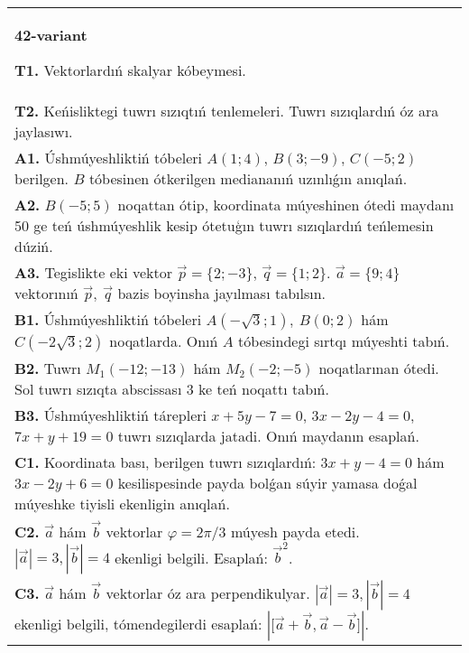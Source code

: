 \documentclass{article}
\begin{document}
\begin{tabular}{m{17cm}}
\textbf{42-variant}

\textbf{T1.} 
Vektorlardıń skalyar kóbeymesi.
 \\
\textbf{T2.} 
Keńisliktegi tuwrı sızıqtıń tenlemeleri. Tuwrı sızıqlardıń óz ara jaylasıwı.
 \\
\textbf{A1.} 
Úshmúyeshliktiń tóbeleri $A (1;4) $, $B (3;-9) $, $C (-5;2) $
berilgen. $B$ tóbesinen ótkerilgen mediananıń uzınlıǵın anıqlań.
 \\
\textbf{A2.} 
$B (-5;5) $ noqattan ótip, koordinata múyeshinen ótedi
maydanı 50 ge teń úshmúyeshlik kesip ótetuģın tuwrı sızıqlardıń teńlemesin
dúziń.
 \\
\textbf{A3.} 
Tegislikte eki vektor
$\overrightarrow{p} = \{ 2; - 3\}$, $\overrightarrow{q} = \{ 1;2\}$.
$\overrightarrow{a} = \{9;4\}$ vektorınıń
$\overrightarrow{p},\ \overrightarrow{q}$ bazis boyinsha jayılması tabılsın.
 \\
\textbf{B1.} 
Úshmúyeshliktiń tóbeleri
\(A\left(-\sqrt{3};1 \right),\ B (0;2) \) hám
\(C\left(-2\sqrt{3};2 \right) \) noqatlarda. Onıń $A$
tóbesindegi sırtqı múyeshti tabıń.
 \\
\textbf{B2.} 
Tuwrı \(M_{1} (-12;-13) \) hám \(M_{2} (-2;-5) \)
noqatlarınan ótedi. Sol tuwrı sızıqta abscissası 3 ke teń noqattı tabıń.
 \\
\textbf{B3.} 
Úshmúyeshliktiń tárepleri \(x+5y-7=0\),
\(3x-2y-4=0\), \(7x+y+19=0\) tuwrı sızıqlarda jatadi. Onıń
maydanın esaplań.
 \\
\textbf{C1.} 
Koordinata bası, berilgen tuwrı sızıqlardıń:
\(3x+y-4=0\) hám \(3x-2y+6=0\) kesilispesinde payda 
bolǵan súyir yamasa doǵal múyeshke tiyisli ekenligin anıqlań.
 \\
\textbf{C2.} 
$\vec{a}$ hám $\vec{b}$ vektorlar $\varphi = 2\pi/3$ múyesh payda etedi. $|\vec{a}| = 3,|\vec{b}| = 4$ ekenligi belgili. Esaplań:
${\vec{b}}^{2}$.
 \\
\textbf{C3.} 
$\vec{a}$ hám $\vec{b}$ vektorlar óz ara perpendikulyar. $|\vec{a}| = 3,|\vec{b}| = 4$ ekenligi belgili, tómendegilerdi esaplań:
$|\lbrack\vec{a} + \vec{b},\vec{a} - \vec{b}\rbrack|$.
 \\

\end{tabular}
\vspace{1cm}
\end{document}
